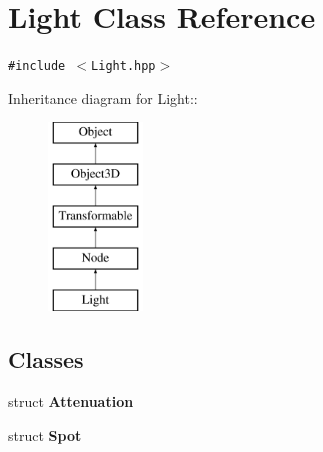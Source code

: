 \hypertarget{classm3g_1_1Light}{
\section{Light Class Reference}
\label{classm3g_1_1Light}
}
{\tt \#include $<$Light.hpp$>$}

Inheritance diagram for Light::\begin{figure}[H]
\begin{center}
\leavevmode
\includegraphics[height=5cm]{classm3g_1_1Light}
\end{center}
\end{figure}
\subsection*{Classes}
\begin{CompactItemize}
\item 
struct \textbf{Attenuation}
\item 
struct \textbf{Spot}
\end{CompactItemize}

